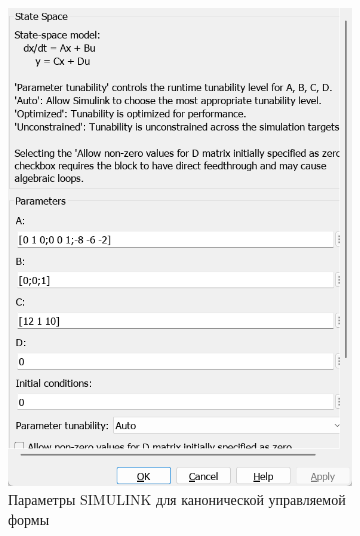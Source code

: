 \documentclass[a4paper, 12pt]{article}
\begin{document}
\begin{figure}[H]
        \begin{subfigure}{0.3\textwidth}
            \centering
            \includegraphics[width=\linewidth]{canonical_controlled_form_1_window.png}
            \caption{Параметры SIMULINK для канонической управляемой формы}
            \label{fig:ccf1w}
        \end{subfigure}
        \begin{subfigure}{0.3\textwidth}
            \centering

\end{subfigure}
\end{figure}
\end{document}
